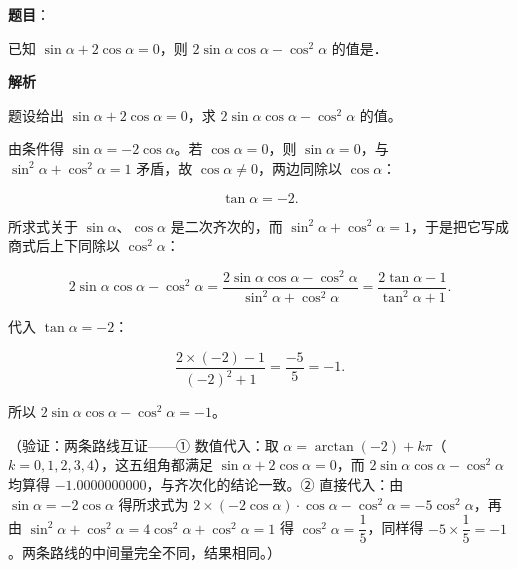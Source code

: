 \begin{answer}

\textbf{题目}：

已知 \(\sin\alpha+2\cos\alpha=0\)，则 \(2\sin\alpha\cos\alpha-\cos^2\alpha\) 的值是\gkblank{}．

\textbf{解析}

题设给出 \(\sin\alpha+2\cos\alpha=0\)，求 \(2\sin\alpha\cos\alpha-\cos^{2}\alpha\) 的值。

由条件得 \(\sin\alpha=-2\cos\alpha\)。若 \(\cos\alpha=0\)，则 \(\sin\alpha=0\)，与 \(\sin^{2}\alpha+\cos^{2}\alpha=1\) 矛盾，故 \(\cos\alpha\neq0\)，两边同除以 \(\cos\alpha\)：

\nopagebreak[4]
\[
\tan\alpha=-2.
\]

所求式关于 \(\sin\alpha\)、\(\cos\alpha\) 是二次齐次的，而 \(\sin^{2}\alpha+\cos^{2}\alpha=1\)，于是把它写成商式后上下同除以 \(\cos^{2}\alpha\)：

\nopagebreak[4]
\[
2\sin\alpha\cos\alpha-\cos^{2}\alpha
=\frac{2\sin\alpha\cos\alpha-\cos^{2}\alpha}{\sin^{2}\alpha+\cos^{2}\alpha}
=\frac{2\tan\alpha-1}{\tan^{2}\alpha+1}.
\]

代入 \(\tan\alpha=-2\)：

\nopagebreak[4]
\[
\frac{2\times(-2)-1}{(-2)^{2}+1}=\frac{-5}{5}=-1.
\]

所以 \(2\sin\alpha\cos\alpha-\cos^{2}\alpha=-1\)。

（验证：两条路线互证——① 数值代入：取 \(\alpha=\arctan(-2)+k\pi\)（\(k=0,1,2,3,4\)），这五组角都满足 \(\sin\alpha+2\cos\alpha=0\)，而 \(2\sin\alpha\cos\alpha-\cos^{2}\alpha\) 均算得 \(-1.0000000000\)，与齐次化的结论一致。② 直接代入：由 \(\sin\alpha=-2\cos\alpha\) 得所求式为 \(2\times(-2\cos\alpha)\cdot\cos\alpha-\cos^{2}\alpha=-5\cos^{2}\alpha\)，再由 \(\sin^{2}\alpha+\cos^{2}\alpha=4\cos^{2}\alpha+\cos^{2}\alpha=1\) 得 \(\cos^{2}\alpha=\dfrac{1}{5}\)，同样得 \(-5\times\dfrac{1}{5}=-1\)。两条路线的中间量完全不同，结果相同。）


\end{answer}

